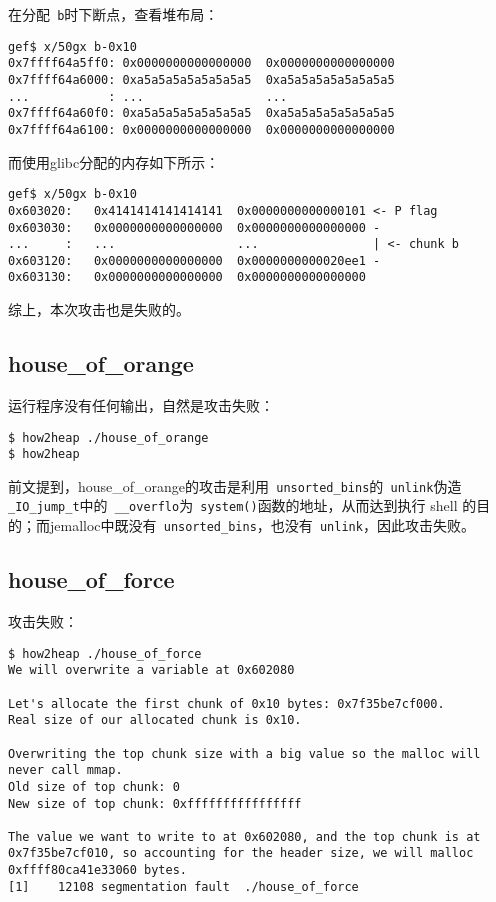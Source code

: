 在分配\verb+ b+时下断点，查看堆布局：
\begin{verbatim}
gef$ x/50gx b-0x10
0x7ffff64a5ff0: 0x0000000000000000  0x0000000000000000
0x7ffff64a6000: 0xa5a5a5a5a5a5a5a5  0xa5a5a5a5a5a5a5a5
...           : ...                 ...
0x7ffff64a60f0: 0xa5a5a5a5a5a5a5a5  0xa5a5a5a5a5a5a5a5
0x7ffff64a6100: 0x0000000000000000  0x0000000000000000
\end{verbatim}

而使用glibc分配的内存如下所示：
\begin{verbatim}
gef$ x/50gx b-0x10
0x603020:   0x4141414141414141  0x0000000000000101 <- P flag
0x603030:   0x0000000000000000  0x0000000000000000 -
...     :   ...                 ...                | <- chunk b
0x603120:   0x0000000000000000  0x0000000000020ee1 -
0x603130:   0x0000000000000000  0x0000000000000000
\end{verbatim}

综上，本次攻击也是失败的。

\subsection{house\_of\_orange}

运行程序没有任何输出，自然是攻击失败：
\begin{verbatim}
$ how2heap ./house_of_orange
$ how2heap 

\end{verbatim}

前文提到，house\_of\_orange的攻击是利用\verb+ unsorted_bins+的\verb+ unlink+伪造 \verb+ _IO_jump_t+中的\verb+ __overflo+为\verb+ system()+函数的地址，从而达到执行 shell 的目的；而jemalloc中既没有\verb+ unsorted_bins+，也没有\verb+ unlink+，因此攻击失败。

\subsection{house\_of\_force}

攻击失败：

\begin{verbatim}
$ how2heap ./house_of_force 
We will overwrite a variable at 0x602080

Let's allocate the first chunk of 0x10 bytes: 0x7f35be7cf000.
Real size of our allocated chunk is 0x10.

Overwriting the top chunk size with a big value so the malloc will never call mmap.
Old size of top chunk: 0
New size of top chunk: 0xffffffffffffffff

The value we want to write to at 0x602080, and the top chunk is at 0x7f35be7cf010, so accounting for the header size, we will malloc 0xffff80ca41e33060 bytes.
[1]    12108 segmentation fault  ./house_of_force

\end{verbatim}

